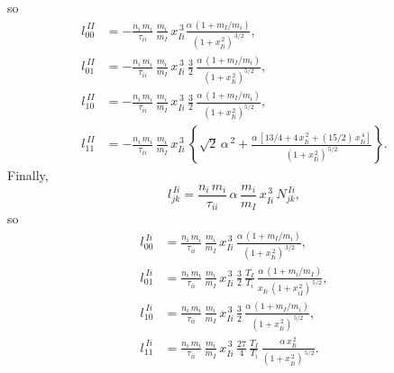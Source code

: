 \documentclass[12pt]{article}
\begin{document}
so
\begin{align}
l^{\,II}_{00} &= -\frac{n_i\,m_i}{\tau_{ii}}\,\frac{m_i}{m_I}\,x_{Ii}^{\,3}\frac{\alpha\,(1+m_I/m_i)}{(1+x_{Ii}^{\,2})^{\,3/2}},\\[0.5ex]
l^{\,II}_{01}&= -\frac{n_i\,m_i}{\tau_{ii}}\,\frac{m_i}{m_I}\,x_{Ii}^{\,3}\,\frac{3}{2}\,\frac{\alpha\,(1+m_I/m_i)}{(1+x_{Ii}^{\,2})^{5/2}},\\[0.5ex]
l^{\,II}_{10}&= -\frac{n_i\,m_i}{\tau_{ii}}\,\frac{m_i}{m_I}\,x_{Ii}^{\,3}\,\frac{3}{2}\,\frac{\alpha\,(1+m_I/m_i)}{(1+x_{Ii}^{\,2})^{5/2}},\\[0.5ex]
l^{\,II}_{11}& = -\frac{n_i\,m_i}{\tau_{ii}}\,\frac{m_i}{m_I}\,x_{Ii}^{\,3}\,\left\{\sqrt{2}\,\alpha^{\,2}+
\frac{\alpha\,[13/4+4\,x_{Ii}^{\,2}+(15/2)\,x_{Ii}^{\,4}]}{(1+x_{Ii}^{\,2})^{\,5/2}}
\right\}.
\end{align}
Finally, 
\begin{equation}
l_{jk}^{\,Ii} = \frac{n_i\,m_i}{\tau_{ii}}\,\alpha\,\frac{m_i}{m_I}\,x_{Ii}^{\,3}\,N^{\,Ii}_{jk},
\end{equation}
so 
\begin{align}
l^{\,Ii}_{00} &= \frac{n_i\,m_i}{\tau_{ii}}\,\frac{m_i}{m_I}\,x_{Ii}^{\,3}\,\frac{\alpha\,(1+m_I/m_i)}{(1+x_{Ii}^{\,2})^{\,3/2}},\\[0.5ex]
l^{\,Ii}_{01}&= \frac{n_i\,m_i}{\tau_{ii}}\,\frac{m_i}{m_I}\,x_{Ii}^{\,3}\,\frac{3}{2}\,\frac{T_I}{T_i}\,\frac{\alpha\,(1+m_i/m_I)}{x_{Ii}\,(1+x_{iI}^{\,2})^{\,5/2}},\\[0.5ex]
l^{\,Ii}_{10}&= \frac{n_i\,m_i}{\tau_{ii}}\,\frac{m_i}{m_I}\,x_{Ii}^{\,3}\,\frac{3}{2}\,\frac{\alpha\,(1+m_I/m_i)}{(1+x_{Ii}^{\,2})^{\,5/2}},\\[0.5ex]
l^{\,Ii}_{11}& = \frac{n_i\,m_i}{\tau_{ii}}\,\frac{m_i}{m_I}\,x_{Ii}^{\,3}\,\frac{27}{4}\,\frac{T_I}{T_i}\,\frac{\alpha\,x_{Ii}^{\,2}}{(1+x_{Ii}^{\,2})^{\,5/2}}.
\end{align}
\end{document}
